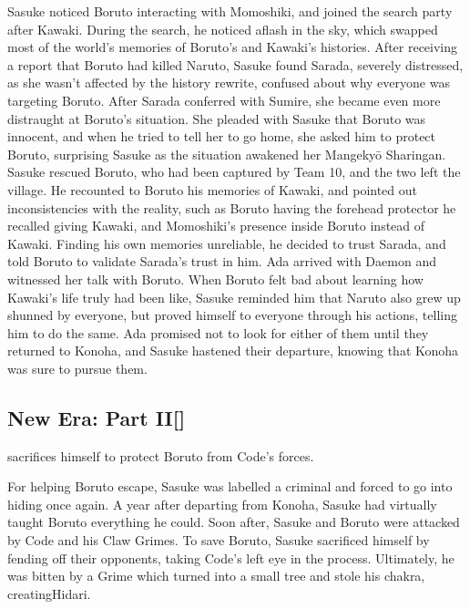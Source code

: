 \documentclass[a4paper,12pt]{article}
\begin{document}
Sasuke noticed Boruto interacting with Momoshiki, and joined the search party after Kawaki. During the search, he noticed aflash in the sky, which swapped most of the world's memories of Boruto's and Kawaki's histories. After receiving a report that Boruto had killed Naruto, Sasuke found Sarada, severely distressed, as she wasn't affected by the history rewrite, confused about why everyone was targeting Boruto. After Sarada conferred with Sumire, she became even more distraught at Boruto's situation. She pleaded with Sasuke that Boruto was innocent, and when he tried to tell her to go home, she asked him to protect Boruto, surprising Sasuke as the situation awakened her Mangekyō Sharingan. Sasuke rescued Boruto, who had been captured by Team 10, and the two left the village. He recounted to Boruto his memories of Kawaki, and pointed out inconsistencies with the reality, such as Boruto having the forehead protector he recalled giving Kawaki, and Momoshiki's presence inside Boruto instead of Kawaki. Finding his own memories unreliable, he decided to trust Sarada, and told Boruto to validate Sarada's trust in him. Ada arrived with Daemon and witnessed her talk with Boruto. When Boruto felt bad about learning how Kawaki's life truly had been like, Sasuke reminded him that Naruto also grew up shunned by everyone, but proved himself to everyone through his actions, telling him to do the same. Ada promised not to look for either of them until they returned to Konoha, and Sasuke hastened their departure, knowing that Konoha was sure to pursue them.\\ \par \vspace{0.5cm}

\subsection*{New Era: Part II[]}\n\nSasuke sacrifices himself to protect Boruto from Code's forces.\\ \par \vspace{0.5cm}

For helping Boruto escape, Sasuke was labelled a criminal and forced to go into hiding once again. A year after departing from Konoha, Sasuke had virtually taught Boruto everything he could. Soon after, Sasuke and Boruto were attacked by Code and his Claw Grimes. To save Boruto, Sasuke sacrificed himself by fending off their opponents, taking Code's left eye in the process. Ultimately, he was bitten by a Grime which turned into a small tree and stole his chakra, creatingHidari.\\ \par \vspace{0.5cm}
\end{document}
